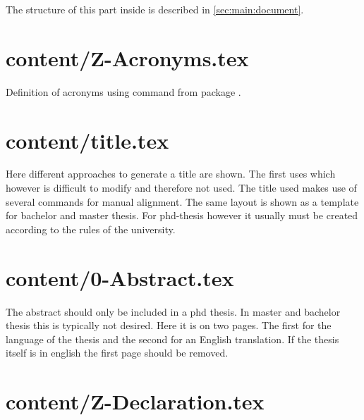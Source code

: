 The structure of this part inside  is described in  \vref{sec:main:document}.

\section{content/Z-Acronyms.tex}

Definition of acronyms using command  from package .


\section{content/title.tex}

Here different approaches to generate a title are shown. The first uses  which however is difficult to modify and therefore not used. The title used makes use of several  commands for manual alignment. The same layout is shown as a template for bachelor and master thesis. For phd-thesis however it usually must be created according to the rules of the university.


\section{content/0-Abstract.tex}

The abstract should only be included in a phd thesis. In master and bachelor thesis this is typically not desired. Here it is on two pages. The first for the language of the thesis and the second for an English translation.
If the thesis itself is in english the first page should be removed.


\section{content/Z-Declaration.tex}


